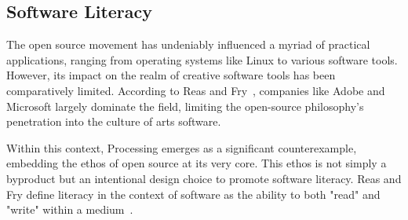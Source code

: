 






\subsection{Software Literacy}

The open source movement has undeniably influenced a myriad of practical applications, ranging from operating systems like Linux to various software tools. However, its impact on the realm of creative software tools has been comparatively limited. According to Reas and Fry~\parencite[30]{reasProcessingProgrammingHandbook2007}, companies like Adobe and Microsoft largely dominate the field, limiting the open-source philosophy's penetration into the culture of arts software. %

Within this context, Processing emerges as a significant counterexample, embedding the ethos of open source at its very core. This ethos is not simply a byproduct but an intentional design choice to promote software literacy. Reas and Fry define literacy in the context of software as the ability to both "read" and "write" within a medium~\parencite[29]{reasProcessingProgrammingHandbook2007}. %

